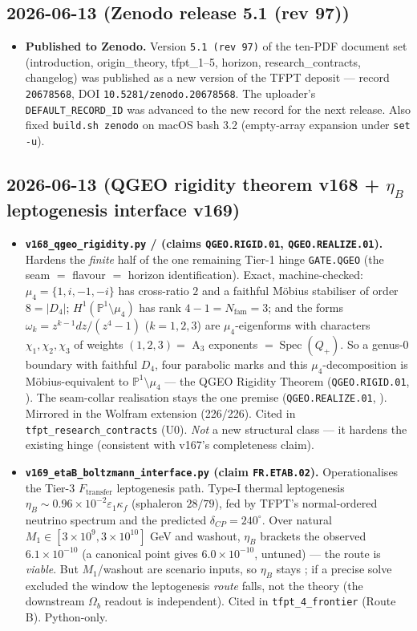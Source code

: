 \subsection*{2026-06-13 (Zenodo release 5.1 (rev 97))}
\begin{itemize}
\item \textbf{Published to Zenodo.} Version \texttt{5.1 (rev 97)} of the ten-PDF document set
  (introduction, origin\_theory, tfpt\_1--5, horizon, research\_contracts, changelog) was
  published as a new version of the TFPT deposit --- record \texttt{20678568},
  DOI \texttt{10.5281/zenodo.20678568}. The uploader's \texttt{DEFAULT\_RECORD\_ID} was advanced
  to the new record for the next release. Also fixed \texttt{build.sh zenodo} on macOS bash 3.2
  (empty-array expansion under \texttt{set -u}).
\end{itemize}

\subsection*{2026-06-13 (QGEO rigidity theorem v168 + $\eta_B$ leptogenesis interface v169)}
\begin{itemize}
\item \textbf{\texttt{v168\_qgeo\_rigidity.py} \mE/\mC{} (claims \texttt{QGEO.RIGID.01},
  \texttt{QGEO.REALIZE.01}).} Hardens the \emph{finite} half of the one remaining Tier-1 hinge
  \texttt{GATE.QGEO} (the seam $=$ flavour $=$ horizon identification). Exact, machine-checked:
  $\mu_4=\{1,i,-1,-i\}$ has cross-ratio $2$ and a faithful M\"obius stabiliser of order $8=|D_4|$;
  $H^1(\mathbb P^1\!\setminus\!\mu_4)$ has rank $4-1=N_{\mathrm{fam}}=3$; and the forms
  $\omega_k=z^{k-1}dz/(z^4-1)$ ($k=1,2,3$) are $\mu_4$-eigenforms with characters
  $\chi_1,\chi_2,\chi_3$ of weights $(1,2,3)=$ A$_3$ exponents $=\operatorname{Spec}(Q_+)$. So a
  genus-0 boundary with faithful $D_4$, four parabolic marks and this $\mu_4$-decomposition is
  M\"obius-equivalent to $\mathbb P^1\!\setminus\!\mu_4$ --- the QGEO Rigidity Theorem
  (\texttt{QGEO.RIGID.01}, \mE). The seam-collar realisation stays the one premise
  (\texttt{QGEO.REALIZE.01}, \mC). Mirrored in the Wolfram extension (226/226). Cited in
  \texttt{tfpt\_research\_contracts} (U0). \emph{Not} a new structural class --- it hardens the
  existing hinge (consistent with v167's completeness claim).
\item \textbf{\texttt{v169\_etaB\_boltzmann\_interface.py} \mC{} (claim \texttt{FR.ETAB.02}).}
  Operationalises the Tier-3 $F_{\mathrm{transfer}}$ leptogenesis path. Type-I thermal
  leptogenesis $\eta_B\sim0.96\times10^{-2}\varepsilon_1\kappa_f$ (sphaleron $28/79$), fed by
  TFPT's normal-ordered neutrino spectrum and the predicted $\delta_{CP}=240^\circ$. Over natural
  $M_1\in[3\times10^9,3\times10^{10}]$ GeV and washout, $\eta_B$ brackets the observed
  $6.1\times10^{-10}$ (a canonical point gives $6.0\times10^{-10}$, untuned) --- the route is
  \emph{viable}. But $M_1$/washout are scenario inputs, so $\eta_B$ stays \mC; if a precise solve
  excluded the window the leptogenesis \emph{route} falls, not the theory (the downstream
  $\Omega_b$ readout is independent). Cited in \texttt{tfpt\_4\_frontier} (Route B). Python-only.
\end{itemize}


